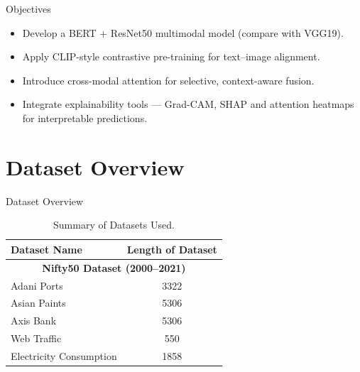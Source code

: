 \documentclass[xcolor=dvipsnames,aspectratio=169]{beamer}
\begin{document}
\begin{frame}{Objectives}
		
        \begin{itemize}
		
        \item Develop a BERT + ResNet50 multimodal model (compare with VGG19).\\

        \item Apply CLIP-style contrastive pre-training for text–image alignment.\\

        \item Introduce cross-modal attention for selective, context-aware fusion.\\

        \item Integrate explainability tools — Grad-CAM, SHAP and attention heatmaps for interpretable predictions.
		
		\end{itemize}
    
\end{frame}



	

\section{Dataset Overview}
\begin{frame}{Dataset Overview}

\begin{table}[!ht]
    \caption{Summary of Datasets Used.}
    \centering
    \begin{tabular}{|p{5cm}|c|}
        \hline
        \textbf{Dataset Name} & \textbf{Length of Dataset} \\
        \hline
        \multicolumn{2}{|c|}{\textbf{Nifty50 Dataset (2000--2021)}} \\
        \hline
        Adani Ports & 3322 \\
        Asian Paints & 5306 \\
        Axis Bank & 5306 \\
        \hline
        Web Traffic & 550 \\
        Electricity Consumption & 1858 \\
        \hline
    \end{tabular}
    \label{tab:dataset_summary}
\end{table}

\end{frame}
\end{document}
